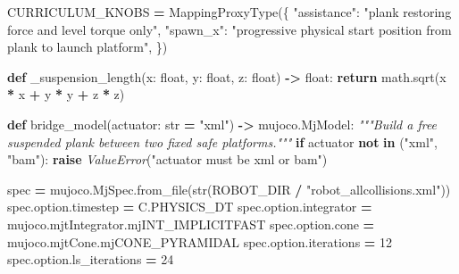 \documentclass[
  chinese,
  11pt,
  letterpaper,
]{article}
\newenvironment{Shaded}{\begin{snugshade}}{\end{snugshade}}
\newcommand{\BuiltInTok}[1]{#1}
\newcommand{\CommentTok}[1]{\textcolor[rgb]{0.56,0.35,0.01}{\textit{#1}}}
\newcommand{\ControlFlowTok}[1]{\textcolor[rgb]{0.13,0.29,0.53}{\textbf{#1}}}
\newcommand{\DecValTok}[1]{\textcolor[rgb]{0.00,0.00,0.81}{#1}}
\newcommand{\KeywordTok}[1]{\textcolor[rgb]{0.13,0.29,0.53}{\textbf{#1}}}
\newcommand{\NormalTok}[1]{#1}
\newcommand{\OperatorTok}[1]{\textcolor[rgb]{0.81,0.36,0.00}{\textbf{#1}}}
\newcommand{\PreprocessorTok}[1]{\textcolor[rgb]{0.56,0.35,0.01}{\textit{#1}}}
\newcommand{\StringTok}[1]{\textcolor[rgb]{0.31,0.60,0.02}{#1}}
\renewenvironment{Shaded}{\par\smallskip}{\par\smallskip}
\begin{document}
\begin{Shaded}
\begin{Highlighting}[]
\NormalTok{CURRICULUM\_KNOBS }\OperatorTok{=}\NormalTok{ MappingProxyType(\{}
    \StringTok{"assistance"}\NormalTok{: }\StringTok{"plank restoring force and level torque only"}\NormalTok{,}
    \StringTok{"spawn\_x"}\NormalTok{: }\StringTok{"progressive physical start position from plank to launch platform"}\NormalTok{,}
\NormalTok{\})}


\KeywordTok{def}\NormalTok{ \_suspension\_length(x: }\BuiltInTok{float}\NormalTok{, y: }\BuiltInTok{float}\NormalTok{, z: }\BuiltInTok{float}\NormalTok{) }\OperatorTok{{-}\textgreater{}} \BuiltInTok{float}\NormalTok{:}
    \ControlFlowTok{return}\NormalTok{ math.sqrt(x }\OperatorTok{*}\NormalTok{ x }\OperatorTok{+}\NormalTok{ y }\OperatorTok{*}\NormalTok{ y }\OperatorTok{+}\NormalTok{ z }\OperatorTok{*}\NormalTok{ z)}


\KeywordTok{def}\NormalTok{ bridge\_model(actuator: }\BuiltInTok{str} \OperatorTok{=} \StringTok{"xml"}\NormalTok{) }\OperatorTok{{-}\textgreater{}}\NormalTok{ mujoco.MjModel:}
    \CommentTok{"""Build a free suspended plank between two fixed safe platforms."""}
    \ControlFlowTok{if}\NormalTok{ actuator }\KeywordTok{not} \KeywordTok{in}\NormalTok{ (}\StringTok{"xml"}\NormalTok{, }\StringTok{"bam"}\NormalTok{):}
        \ControlFlowTok{raise} \PreprocessorTok{ValueError}\NormalTok{(}\StringTok{"actuator must be xml or bam"}\NormalTok{)}

\NormalTok{    spec }\OperatorTok{=}\NormalTok{ mujoco.MjSpec.from\_file(}\BuiltInTok{str}\NormalTok{(ROBOT\_DIR }\OperatorTok{/} \StringTok{"robot\_allcollisions.xml"}\NormalTok{))}
\NormalTok{    spec.option.timestep }\OperatorTok{=}\NormalTok{ C.PHYSICS\_DT}
\NormalTok{    spec.option.integrator }\OperatorTok{=}\NormalTok{ mujoco.mjtIntegrator.mjINT\_IMPLICITFAST}
\NormalTok{    spec.option.cone }\OperatorTok{=}\NormalTok{ mujoco.mjtCone.mjCONE\_PYRAMIDAL}
\NormalTok{    spec.option.iterations }\OperatorTok{=} \DecValTok{12}
\NormalTok{    spec.option.ls\_iterations }\OperatorTok{=} \DecValTok{24}


\end{Highlighting}
\end{Shaded}
\end{document}
